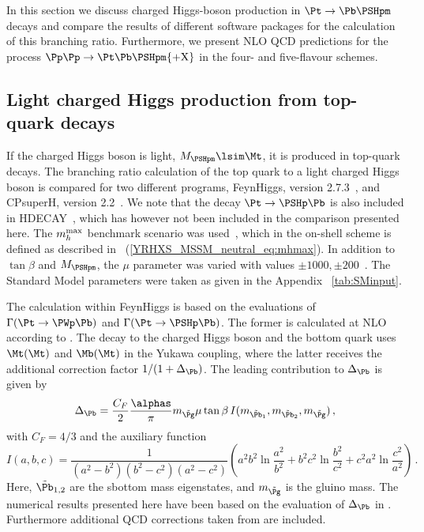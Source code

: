 In this section we discuss charged Higgs-boson production in $\Pt \to
\Pb \PSHpm$ decays and compare the results of different software
packages for the calculation of this branching ratio. Furthermore, we
present NLO QCD predictions for the process $\Pp\Pp \to \Pt\Pb 
\PSHpm{\rm + X}$ in the four- and five-flavour schemes.

\subsection{Light charged Higgs production from top-quark decays}

If the charged Higgs boson is light, $\MHpm \lsim \Mt$, 
it is produced in top-quark decays. The branching ratio
calculation of the top quark to a light charged Higgs boson is
compared for two different programs, {\sc FeynHiggs}, version
2.7.3~\cite{Heinemeyer:1998yj,Heinemeyer:1998np,Degrassi:2002fi,Frank:2006yh},
and {\sc CPsuperH}, version 2.2~\cite{Lee:2003nta,Lee:2007gn}. 
We note that the decay  $\Pt \to \PSHp \Pb$ is also included in {\sc HDECAY}~\cite{Djouadi:1997yw}, 
which has however not been included in the comparison presented here. 
The
$m_h^{\rm max}$ benchmark scenario was used~\cite{Carena:2002qg},
which in the on-shell scheme is defined as described 
in \Eq~(\ref{YRHXS_MSSM_neutral_eq:mhmax}).
In addition to $\tan \beta$ and $\MHpm$, the $\mu$ parameter
was varied with values $\pm 1000, \pm 200$\UGeV~\cite{Carena:2005ek}. 
The Standard Model parameters were taken as given in the 
Appendix \Table~\ref{tab:SMinput}.

The calculation within {\sc FeynHiggs} is based on the evaluations of
$\Gamma(\Pt \to \PWp \Pb)$ and $\Gamma(\Pt \to \PSHp \Pb)$. The former is
calculated at NLO according to . The decay
to the charged Higgs boson and the bottom quark uses $\Mt(\Mt)$ and 
$\Mb(\Mt)$ in the Yukawa coupling, where the
latter receives the additional correction factor $1/(1 +
\Delta_{\Pb})$. The leading contribution to $\Delta_{\Pb}$ is given
by~\cite{Carena:1999py}
\begin{equation}
\label{eq:qcd_tanb_enhanced}
\Delta_{\Pb} = \frac{C_F}{2}\frac{\alphas}{\pi} 
m_{\tilde{\Pg}} \mu \tan\beta  \,
I(m_{\tilde{\Pb}_1},m_{\tilde{\Pb}_2},m_{\tilde{\Pg}}) \, ,
\end{equation}
with $C_F = 4/3$ and the auxiliary function
\begin{equation}
\label{eq:I}
I(a,b,c) = \frac{1}{(a^2-b^2)(b^2-c^2)(a^2-c^2)} \left(
a^2 b^2 \ln \frac{a^2}{b^2} + 
b^2 c^2 \ln \frac{b^2}{c^2} + 
c^2 a^2 \ln \frac{c^2}{a^2}
\right) \, .
\end{equation}
Here, $\tilde{\Pb}_{1,2}$ are the sbottom mass eigenstates, and
$m_{\tilde{\Pg}}$ is the gluino mass. The numerical results presented
here have been based on the evaluation of $\Delta_{\Pb}$ in
.  
Furthermore additional QCD corrections taken from
 are included.

